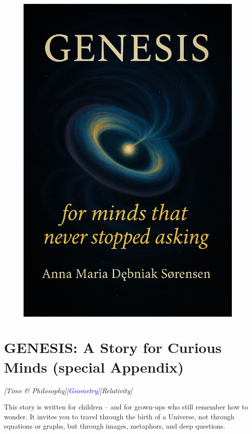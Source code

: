 \documentclass{article}
\newcommand{\geometrytag}{\textcolor{blue}{\textit{[Geometry]}}}
\newcommand{\timetag}{\textcolor{orange!80!black}{\textit{[Time \& Philosophy]}}}
\newcommand{\grtag}{\textcolor{blue!40!black}{\textit{[Relativity]}}}
\begin{document}
\clearpage
\thispagestyle{empty}
\begin{figure}[t!]
  \centering
  \includegraphics[width=\textwidth,height=\textheight,keepaspectratio]{genesis_cover_en.png}
\end{figure}
\clearpage



\section*{GENESIS: A Story for Curious Minds (special Appendix)}
\timetag  \geometrytag  \grtag


\vspace{1ex}
\noindent
This story is written for children – and for grown-ups who still remember how to wonder.  
It invites you to travel through the birth of a Universe, not through equations or graphs, but through images, metaphors, and deep questions.
\end{document}
